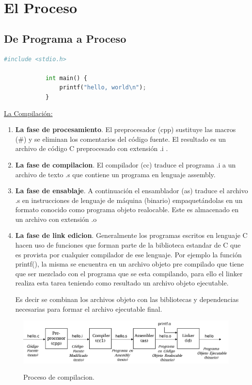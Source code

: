 \documentclass[../main.tex]{subfiles}
\begin{document}

\section{El Proceso}
    \subsection{De Programa a Proceso}
        \begin{lstlisting}[language=Python, caption=hola mundo.]
            #include <stdio.h>

            int main() {
                printf("hello, world\n");
            }
        \end{lstlisting}

        \underline{La Compilación:}
        \begin{enumerate}
            \item \textbf{La fase de procesamiento}. El preprocesador (cpp) sustituye las macros (\#) y se eliminan los comentarios del código fuente. El resultado es un archivo de código C preprocesado con extensión .i .
            \item \textbf{La fase de compilacion}. El compilador (cc) traduce el programa .i a un archivo de texto .s que contiene un programa en lenguaje assembly.
            \item \textbf{La fase de ensablaje}. A continuación el ensamblador (as) traduce el archivo .s en instrucciones de lenguaje de máquina (binario) empaquetándolas en un formato conocido como programa objeto realocable. Este es almacenado en un archivo con extensión .o
            \item \textbf{La fase de link edicion}. Generalmente los programas escritos en lenguaje C hacen uso de funciones que forman parte de la biblioteca estandar de C que es provista por cualquier compilador de ese lenguaje. Por ejemplo la función printf(), la misma se encuentra en un archivo objeto pre compilado que tiene que ser mezclado con el programa que se esta compilando, para ello el linker realiza esta tarea teniendo como resultado un archivo objeto ejecutable. 
            
            Es decir se combinan los archivos objeto con las bibliotecas y dependencias necesarias para formar el archivo ejecutable final.
        \end{enumerate}

        \begin{figure}[bh]
            \centering
            \includegraphics[scale=0.33]{../images/compilation.jpg}
            \label{fig:img1}
            \caption{Proceso de compilacion.}
        \end{figure}
\end{document}

